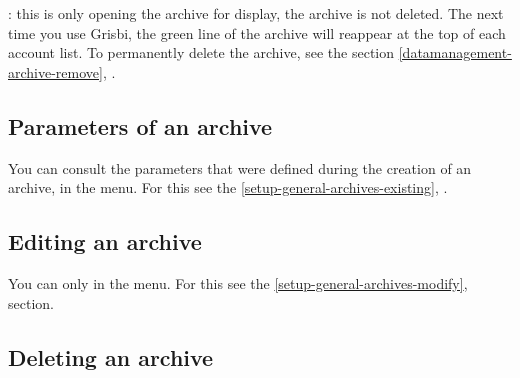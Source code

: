\Note{}: this is only opening the archive for display, the archive is not deleted. The next time you use Grisbi, the green line of the archive will reappear at the top of each account list. To permanently delete the archive, see the section \vref{datamanagement-archive-remove}, .


\subsection{Parameters of an archive\label{datamanagement-archive-parameters}}%

You can consult the parameters that were defined during the creation of an archive, in the 
 menu. For this see the \vref{setup-general-archives-existing}, .

\subsection{Editing an archive\label{datamanagement-archive-modify}}%

You can only  in the  menu. For this see the \vref{setup-general-archives-modify},  section.

\subsection{Deleting an archive\label{datamanagement-archive-remove}}%

